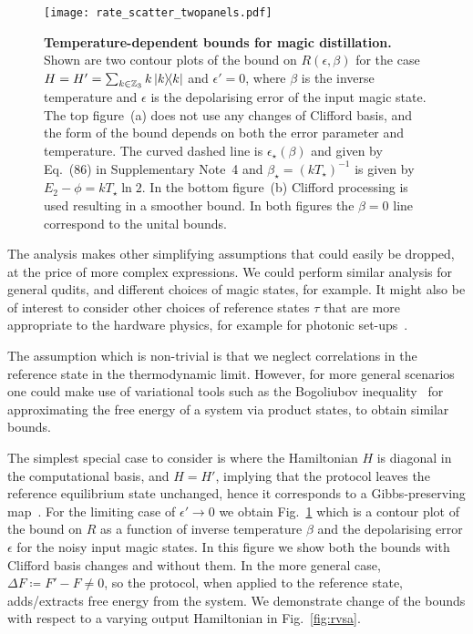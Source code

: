 \documentclass[
onecolumn,
superscriptaddress
]{revtex4-1}
\begin{document}
\begin{figure}[t!]
    \centering
    \texttt{[image: rate\_scatter\_twopanels.pdf]}
    \caption{\textbf{Temperature-dependent bounds for magic distillation.} Shown are two contour plots of the bound on $R(\epsilon, \beta)$ for the case $H = H' = \sum_{k \in \mathbb{Z}_3} k \ketbra{k}$ and $\epsilon' = 0$, where $\beta$ is the inverse temperature and $\epsilon$ is the depolarising error of the input magic state. 
The top figure~(a) does not use any changes of Clifford basis, and the form of the bound depends on both the error parameter and temperature. The curved dashed line is $\epsilon_\star(\beta)$ and given by Eq.~(86) in Supplementary Note~4 and $\beta_\star = (kT_\star)^{-1}$ is given by $E_2-\phi = kT_\star \ln 2$. 
In the bottom figure~(b) Clifford processing is used resulting in a smoother bound. In both figures the $\beta = 0$ line correspond to the unital bounds.}
    \label{fig:rate_contour}
\end{figure}

The analysis makes other simplifying assumptions that could easily be dropped, at the price of more complex expressions. We could perform similar analysis for general qudits, and different choices of magic states, for example. It might also be of interest to consider other choices of reference states $\tau$ that are more appropriate to the hardware physics, for example for photonic set-ups~\cite{bombin2021interleaving}.

The assumption which is non-trivial is that we neglect correlations in the reference state in the thermodynamic limit. However, for more general scenarios one could make use of variational tools such as the Bogoliubov inequality~\cite{bogolyubov_1966} for approximating the free energy of a system via product states, to obtain similar bounds.

The simplest special case to consider is where the Hamiltonian $H$ is diagonal in the computational basis, and $H=H'$, implying that the protocol leaves the reference equilibrium state unchanged, hence it corresponds to a Gibbs-preserving map~\cite{faist_2015}. For the limiting case of $\epsilon' \rightarrow 0$ we obtain Fig.~\ref{fig:rate_contour} which is a contour plot of the bound on $R$ as a function of inverse temperature $\beta$ and the depolarising error $\epsilon$ for the noisy input magic states. In this figure we show both the bounds with Clifford basis changes and without them. In the more general case, $\Delta F \coloneqq F' - F \ne 0$, so the protocol, when applied to the reference state, adds/extracts free energy from the system.
We demonstrate change of the bounds with respect to a varying output Hamiltonian in Fig.~\ref{fig:rvsa}.
\end{document}
